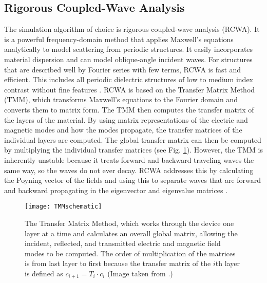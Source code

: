 \documentclass{article}
\begin{document}
\subsection*{Rigorous Coupled-Wave Analysis}
The simulation algorithm of choice is rigorous coupled-wave analysis (RCWA). It is a powerful frequency-domain method that applies Maxwell's equations analytically to model scattering from periodic structures. It easily incorporates material dispersion and can model oblique-angle incident waves. 
For structures that are described well by Fourier series with few terms, RCWA is fast and efficient. This includes all periodic dielectric structures of low to medium index contrast without fine features \cite{Rumpf}. RCWA is based on the Transfer Matrix Method (TMM), which transforms Maxwell's equations to the Fourier domain and converts them to matrix form. The TMM then computes the transfer matrix of the layers of the material. By using matrix representations of the electric and magnetic modes and how the modes propagate, the transfer matrices of the individual layers are computed. The global transfer matrix can then be computed by multiplying the individual transfer matrices (see Fig. \ref{TMMschematic}). However, the TMM is inherently unstable because it treats forward and backward traveling waves the same way, so the waves do not ever decay. RCWA addresses this by calculating the Poyning vector of the fields and using this to separate waves that are forward and backward propagating in the eigenvector and eigenvalue matrices \cite{TMMLecture}. 

\begin{figure}[h]
	\centering
	\texttt{[image: TMMschematic]}
	\caption{The Transfer Matrix Method, which works through the device one layer at a time and calculates an overall global matrix, allowing the incident, reflected, and transmitted electric and magnetic field modes to be computed. The order of multiplication of the matrices is from last layer to first because the transfer matrix of the $i$th layer is defined as $c_{i+1} = T_i \cdot c_i$ (Image taken from \cite{TMMLecture}.)}
	\label{TMMschematic}
\end{figure}
\end{document}
